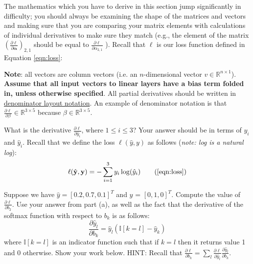 \documentclass[11pt,addpoints,answers]{exam}
\newcommand{\Ib}{\mathbb{I}}
\newcommand{\yv}{\mathbf{y}}
\begin{document}
\begin{questions}
\begin{parts}
The mathematics which you have to derive in this section jump significantly in difficulty; you should always be examining the shape of the matrices and vectors and making sure that you are comparing your matrix elements with calculations of individual derivatives to make sure they match (e.g., the element of the matrix $(\frac{\partial \ell}{\partial \boldsymbol{\alpha}})_{2,1}$ should be equal to $\frac{\partial \ell}{\partial \alpha_{2,1}}$  ). Recall that $\ell$ is our loss function defined in Equation \ref{eqn:loss}:

{\bf Note}: all vectors are column vectors (i.e. an $n$-dimensional vector $v \in \mathbb{R}^{n \times 1}$). \textbf{Assume that all input vectors to linear layers have a bias term folded in, unless otherwise specified}. All partial derivatives should be written in \href{https://en.wikipedia.org/wiki/Matrix_calculus#Denominator-layout_notation}{denominator layout notation}. An example of denominator notation is that $\frac{\partial \ell}{\partial \beta} \in \mathbb{R}^{3 \times 5}$ because $\beta \in \mathbb{R}^{3 \times 5}$.
    
    
\begin{subparts}
    \subpart[1] What is the derivative $\frac{\partial \ell}{\partial \hat{y}_i}$, where $1 \leq i \leq 3$? Your answer should be in terms of $y_i$ and $\hat{y}_i$. Recall that we define the loss $\ell(\hat{y}, y)$ as follows (\textit{note: log is a natural log}):
    \begin{align}
        \ell(\hat{\yv},\yv) = - \sum_{i=1}^3 y_i \log(\hat{y}_i) \tag{\ref{eqn:loss}}
    \end{align}
    
    \begin{your_solution}[title=${\partial \ell}/{\partial \hat{y}_i}$, height=3cm, width=15cm]
    \end{your_solution}
    
    \clearpage
    
    \subpart[1] Suppose we have $\hat{y} = [0.2, 0.7, 0.1]^T$ and $y$ = $[0, 1, 0]^T$. Compute the value of $\frac{\partial \ell}{\partial b_2}$. Use your answer from part (a), as well as the fact that the derivative of the softmax function with respect to $b_k$ is as follows:
    \begin{equation}
    \label{eqn:dydbk}
    \frac{\partial \hat{y}_l}{\partial b_k} = \hat{y}_l(\Ib[k=l]-\hat{y}_k)
    \end{equation}
    where $\Ib[k=l]$ is an indicator function such that if $k=l$ then it returns value 1 and 0 otherwise. Show your work below.
    \newline \newline
    HINT: Recall that $\frac{\partial \ell}{\partial b_k} = \sum_l \frac{\partial \ell}{\partial \hat{y}_l}\frac{\partial \hat{y}_l}{\partial b_k}$.
    

\end{subparts}
\end{parts}
\end{questions}
\end{document}
